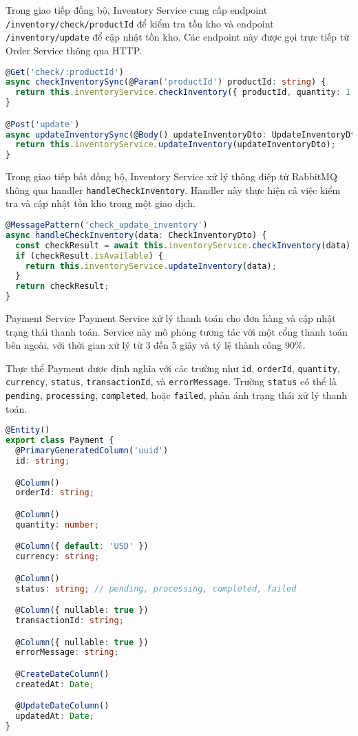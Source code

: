 Trong giao tiếp đồng bộ, Inventory Service cung cấp endpoint \texttt{/inventory/check/{productId}} để kiểm tra tồn kho và endpoint \texttt{/inventory/update} để cập nhật tồn kho. Các endpoint này được gọi trực tiếp từ Order Service thông qua HTTP.

\begin{lstlisting}[language=Typescript]
@Get('check/:productId')
async checkInventorySync(@Param('productId') productId: string) {
  return this.inventoryService.checkInventory({ productId, quantity: 1 });
}

@Post('update')
async updateInventorySync(@Body() updateInventoryDto: UpdateInventoryDto) {
  return this.inventoryService.updateInventory(updateInventoryDto);
}
\end{lstlisting}

Trong giao tiếp bất đồng bộ, Inventory Service xử lý thông điệp từ RabbitMQ thông qua handler \texttt{handleCheckInventory}. Handler này thực hiện cả việc kiểm tra và cập nhật tồn kho trong một giao dịch.

\begin{lstlisting}[language=Typescript]
@MessagePattern('check_update_inventory')
async handleCheckInventory(data: CheckInventoryDto) {
  const checkResult = await this.inventoryService.checkInventory(data);
  if (checkResult.isAvailable) {
    return this.inventoryService.updateInventory(data);
  }
  return checkResult;
}
\end{lstlisting}

Payment Service
Payment Service xử lý thanh toán cho đơn hàng và cập nhật trạng thái thanh toán. Service này mô phỏng tương tác với một cổng thanh toán bên ngoài, với thời gian xử lý từ 3 đến 5 giây và tỷ lệ thành công 90\%.

Thực thể Payment được định nghĩa với các trường như \texttt{id}, \texttt{orderId}, \texttt{quantity}, \texttt{currency}, \texttt{status}, \texttt{transactionId}, và \texttt{errorMessage}. Trường \texttt{status} có thể là \texttt{pending}, \texttt{processing}, \texttt{completed}, hoặc \texttt{failed}, phản ánh trạng thái xử lý thanh toán.

\begin{lstlisting}[language=Typescript]
@Entity()
export class Payment {
  @PrimaryGeneratedColumn('uuid')
  id: string;

  @Column()
  orderId: string;

  @Column()
  quantity: number;

  @Column({ default: 'USD' })
  currency: string;

  @Column()
  status: string; // pending, processing, completed, failed

  @Column({ nullable: true })
  transactionId: string;

  @Column({ nullable: true })
  errorMessage: string;

  @CreateDateColumn()
  createdAt: Date;

  @UpdateDateColumn()
  updatedAt: Date;
}
\end{lstlisting}

